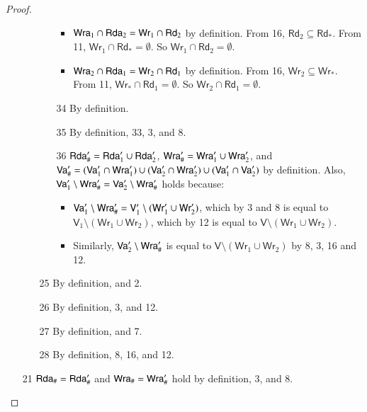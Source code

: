\documentclass{llncs}
\newcommand{\readset}{\mathsf{Rd}}
\newcommand{\valuset}{\mathsf{V}}
\newcommand{\writeset}{\mathsf{Wr}}
\begin{document}
\begin{proof}
\begin{itemize}
\begin{itemize}
\begin{itemize}
\begin{itemize}
    \item $\writeseta_1 \cap \readseta_2 = \writeset_1 \cap \readset_2$ by definition.
    From 16, $\readset_2 \subseteq \readset_*$. From 11, $\writeset_1 \cap \readset_* = \emptyset$. So $\writeset_1 \cap \readset_2 = \emptyset$.

    \item $\writeseta_2 \cap \readseta_1 = \writeset_2 \cap \readset_1$ by definition.
    From 16, $\writeset_2 \subseteq \writeset_*$. From 11, $\writeset_* \cap \readset_1 = \emptyset$. So $\writeset_2 \cap \readset_1 = \emptyset$.
    \end{itemize}
  \item[34] By definition.
  \item[35] By definition, 33, 3, and 8.
  \item[36] $\mathsf {Rda}_\#' = \mathsf {Rda}'_1 \cup \mathsf {Rda}'_2$, $\mathsf {Wra}_\#' = \mathsf {Wra}'_1 \cup \mathsf {Wra}'_2$, and $\mathsf {Va}_\#' = (\mathsf {Va}'_1 \cap \mathsf {Wra}'_1) \cup (\mathsf {Va}'_2 \cap \mathsf {Wra}'_2) \cup (\mathsf {Va}'_1 \cap \mathsf {Va}'_2)$ by definition.
%
    Also, $\mathsf {Va}'_1 \setminus \mathsf {Wra}_\#' = \mathsf {Va}'_2 \setminus \mathsf {Wra}_\#'$ holds because:
    \begin{itemize}
    \item $\valuseta'_1 \setminus \writeseta_\#' = \valuset'_1 \setminus (\writeset'_1 \cup \writeset'_2)$, which by 3 and 8 is equal to $\valuset_1 \setminus (\writeset_1 \cup \writeset_2)$, which by 12 is equal to $\valuset \setminus (\writeset_1 \cup \writeset_2)$.
      \item Similarly, $\mathsf {Va}'_2 \setminus \mathsf {Wra}_\#'$ is equal to $\valuset \setminus (\writeset_1 \cup \writeset_2)$ by 8, 3, 16 and 12.
    \end{itemize}
  \end{itemize}
\item[25] By definition, and 2.
\item[26] By definition, 3, and 12.
\item[27] By definition, and 7.
\item[28] By definition, 8, 16, and 12.
  \end{itemize}
\item[21] $\mathsf {Rda}_\# = \mathsf {Rda}'_\#$
  and $\mathsf {Wra}_\# = \mathsf {Wra}'_\#$ hold by definition, 3, and 8.

\end{itemize}
\end{proof}
\end{document}
